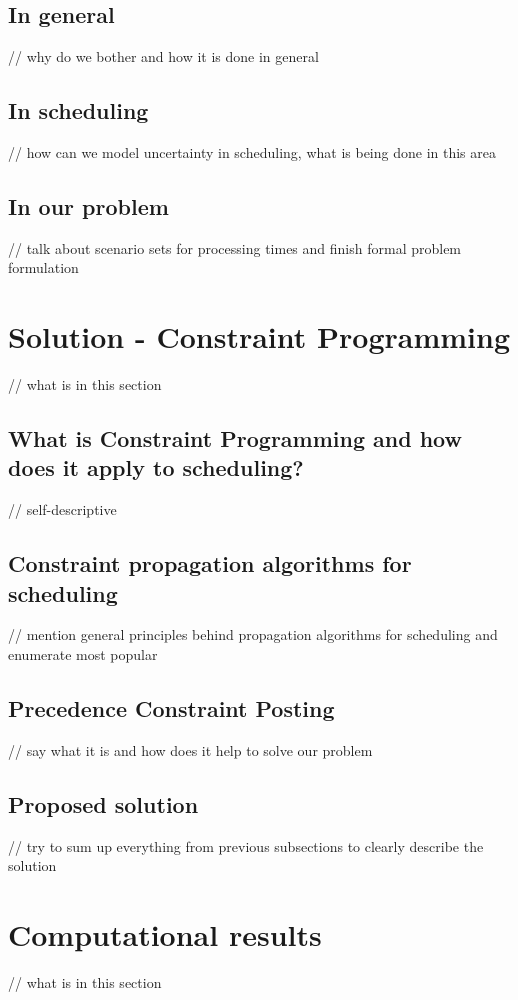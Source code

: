 \documentclass{article}
\theoremstyle{definition}
\begin{document}
\subsection{In general}
// why do we bother and how it is done in general

\subsection{In scheduling}
// how can we model uncertainty in scheduling, what is being done in this area

\subsection{In our problem}
// talk about scenario sets for processing times and finish formal problem formulation



\section{Solution - Constraint Programming}
// what is in this section

\subsection{What is Constraint Programming and how does it apply to scheduling?}
// self-descriptive

\subsection{Constraint propagation algorithms for scheduling}
// mention general principles behind propagation algorithms for scheduling and enumerate most popular

\subsection{Precedence Constraint Posting}
// say what it is and how does it help to solve our problem

\subsection{Proposed solution}
// try to sum up everything from previous subsections to clearly describe the solution


\section{Computational results}
// what is in this section
\end{document}
